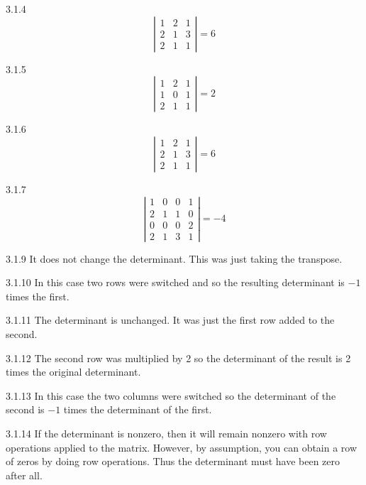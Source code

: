 \begin{Answer}{3.1.4}
\[
\left|
\begin{array}{ccc}
1 & 2 & 1 \\
2 & 1 & 3 \\
2 & 1 & 1
\end{array}
\right| =  6
\]
\end{Answer}
\begin{Answer}{3.1.5}
\[
\left|
\begin{array}{ccc}
1 & 2 & 1 \\
1 & 0 & 1 \\
2 & 1 & 1
\end{array}
\right| =  2
\]
\end{Answer}
\begin{Answer}{3.1.6}
\[
\left|
\begin{array}{ccc}
1 & 2 & 1 \\
2 & 1 & 3 \\
2 & 1 & 1
\end{array}
\right| = 6
\]
\end{Answer}
\begin{Answer}{3.1.7}
\[
\left|
\begin{array}{cccc}
1 & 0 & 0 & 1 \\
2 & 1 & 1 & 0 \\
0 & 0 & 0 & 2 \\
2 & 1 & 3 & 1
\end{array}
\right| = -4
\]
\end{Answer}
\begin{Answer}{3.1.9}
It does not change the determinant. This was just taking the transpose.
\end{Answer}
\begin{Answer}{3.1.10}
In this case two rows were switched and so the resulting determinant is $-1$
times the first.
\end{Answer}
\begin{Answer}{3.1.11}
The determinant is unchanged. It was just the first row added to the second.
\end{Answer}
\begin{Answer}{3.1.12}
The second row was multiplied by 2 so the determinant of the result is 2
times the original determinant.
\end{Answer}
\begin{Answer}{3.1.13}
In this case the two columns were switched so the determinant of the second
is $-1$ times the determinant of the first.
\end{Answer}
\begin{Answer}{3.1.14}
If the determinant is nonzero, then it will remain nonzero with row operations applied to the matrix.
However, by assumption, you can obtain a row of zeros by doing row
operations. Thus the determinant must have been zero after all.
\end{Answer}
